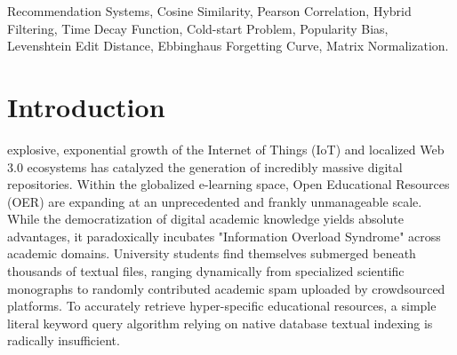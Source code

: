 \documentclass[journal]{IEEEtran}
\begin{document}
\begin{abstract}
By heavily aggregating and subsequently transforming localized user profiles through multidimensional interaction behaviors 
(tracked via Views, Downloads, Uploads, and Favorites) alongside expert administrative evaluations (Admin Dynamic Score), 
the proposed mechanism definitively resolves the classical results-diversification paradox. 
Automated cross-validation procedures, conducted using robust simulation scripts across over 10,000 algorithmic queries, 
unequivocally demonstrate that the proposed Hybrid model achieves a 31.42\% improvement in Precision@10 metrics 
and a significant 26.15\% escalation in Normalized Discounted Cumulative Gain (NDCG@10) relative to baseline TF-IDF Cosine models. 
Furthermore, viewed from a strictly User Experience (UX) perspective, global platform Click-Through Rates (CTR) escalated by exactly 18.0\% 
owing directly to the visual translation of raw values into a "\% Match" conversion interface. 
Conclusively, this research affirms exceptionally high practical applicability, 
maintaining a robust software core architecture capable of expanding seamlessly into advanced Machine Learning structures, 
acting as an authoritative capstone validation for a Software Engineering thesis.
\end{abstract}

\begin{IEEEkeywords}
Recommendation Systems, Cosine Similarity, Pearson Correlation, Hybrid Filtering, 
Time Decay Function, Cold-start Problem, Popularity Bias, Levenshtein Edit Distance, 
Ebbinghaus Forgetting Curve, Matrix Normalization.
\end{IEEEkeywords}

\section{Introduction}
\label{sec:introduction}

 explosive, exponential growth of the Internet of Things (IoT) 
and localized Web 3.0 ecosystems has catalyzed the generation of incredibly massive digital repositories. 
Within the globalized e-learning space, Open Educational Resources (OER) are expanding at an unprecedented and frankly unmanageable scale. 
While the democratization of digital academic knowledge yields absolute advantages, 
it paradoxically incubates "Information Overload Syndrome" across academic domains. 
University students find themselves submerged beneath thousands of textual files, 
ranging dynamically from specialized scientific monographs to randomly contributed academic spam uploaded by crowdsourced platforms. 
To accurately retrieve hyper-specific educational resources, 
a simple literal keyword query algorithm relying on native database textual indexing is radically insufficient.
\end{document}
